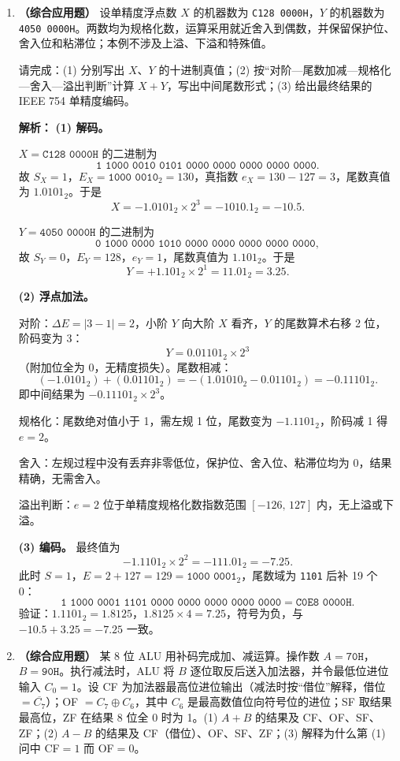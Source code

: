 \begin{enumerate}[resume]
\item \textbf{（综合应用题）} 设单精度浮点数 $X$ 的机器数为 \texttt{C128 0000H}，$Y$ 的机器数为 \texttt{4050 0000H}。两数均为规格化数，运算采用就近舍入到偶数，并保留保护位、舍入位和粘滞位；本例不涉及上溢、下溢和特殊值。

请完成：(1) 分别写出 $X$、$Y$ 的十进制真值；(2) 按“对阶—尾数加减—规格化—舍入—溢出判断”计算 $X+Y$，写出中间尾数形式；(3) 给出最终结果的 IEEE 754 单精度编码。

\ifshowsolutions\par\noindent\textbf{解析：} \textbf{(1) 解码。}

$X=\texttt{C128 0000H}$ 的二进制为
\[
\texttt{1\ 1000 0010\ 0101 0000 0000 0000 0000 0000}.
\]
故 $S_X=1$，$E_X=\texttt{1000 0010}_2=130$，真指数 $e_X=130-127=3$，尾数真值为 $1.0101_2$。于是
\[
X=-1.0101_2\times2^{3}=-1010.1_2=-10.5.
\]

$Y=\texttt{4050 0000H}$ 的二进制为
\[
\texttt{0\ 1000 0000\ 1010 0000 0000 0000 0000 0000},
\]
故 $S_Y=0$，$E_Y=128$，$e_Y=1$，尾数真值为 $1.101_2$。于是
\[
Y=+1.101_2\times2^{1}=11.01_2=3.25.
\]

\textbf{(2) 浮点加法。}

对阶：$\Delta E=|3-1|=2$，小阶 $Y$ 向大阶 $X$ 看齐，$Y$ 的尾数算术右移 2 位，阶码变为 3：
\[
Y=0.01101_2\times2^{3}
\]
（附加位全为 0，无精度损失）。尾数相减：
\[
(-1.0101_2)+(0.01101_2)=-(1.01010_2-0.01101_2)
=-0.11101_2.
\]
即中间结果为 $-0.11101_2\times2^{3}$。

规格化：尾数绝对值小于 1，需左规 1 位，尾数变为 $-1.1101_2$，阶码减 1 得 $e=2$。

舍入：左规过程中没有丢弃非零低位，保护位、舍入位、粘滞位均为 0，结果精确，无需舍入。

溢出判断：$e=2$ 位于单精度规格化数指数范围 $[-126,\,127]$ 内，无上溢或下溢。

\textbf{(3) 编码。} 最终值为
\[
-1.1101_2\times2^{2}=-111.01_2=-7.25.
\]
此时 $S=1$，$E=2+127=129=\texttt{1000 0001}_2$，尾数域为 \texttt{1101} 后补 19 个 0：
\[
\texttt{1\ 1000 0001\ 1101 0000 0000 0000 0000 0000}
=\texttt{C0E8 0000H}.
\]
验证：$1.1101_2=1.8125$，$1.8125\times4=7.25$，符号为负，与 $-10.5+3.25=-7.25$ 一致。\else \answerarea[10] \fi

\item \textbf{（综合应用题）} 某 8 位 ALU 用补码完成加、减运算。操作数 $A=\texttt{70H}$，$B=\texttt{90H}$。执行减法时，ALU 将 $B$ 逐位取反后送入加法器，并令最低位进位输入 $C_0=1$。设 CF 为加法器最高位进位输出（减法时按“借位”解释，借位 $=\overline{C_7}$）；OF $=C_7\oplus C_6$，其中 $C_6$ 是最高数值位向符号位的进位；SF 取结果最高位，ZF 在结果 8 位全 0 时为 1。(1) $A+B$ 的结果及 CF、OF、SF、ZF；(2) $A-B$ 的结果及 CF（借位）、OF、SF、ZF；(3) 解释为什么第 (1) 问中 CF$=1$ 而 OF$=0$。


\end{enumerate}
